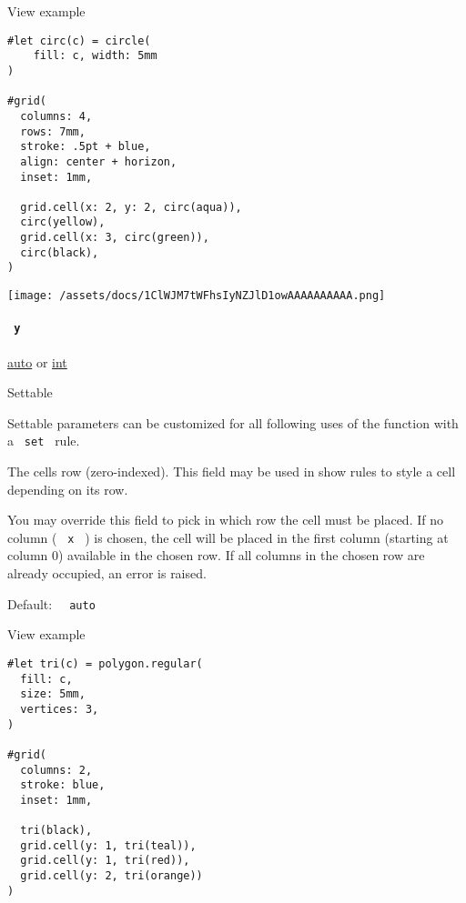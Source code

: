 
View example

\begin{verbatim}
#let circ(c) = circle(
    fill: c, width: 5mm
)

#grid(
  columns: 4,
  rows: 7mm,
  stroke: .5pt + blue,
  align: center + horizon,
  inset: 1mm,

  grid.cell(x: 2, y: 2, circ(aqua)),
  circ(yellow),
  grid.cell(x: 3, circ(green)),
  circ(black),
)
\end{verbatim}

\texttt{[image: /assets/docs/1ClWJM7tWFhsIyNZJlD1owAAAAAAAAAA.png]}

\paragraph{\texorpdfstring{\texttt{\ y\ }}{ y }}\label{definitions-cell-y}

\href{/docs/reference/foundations/auto/}{auto} {or}
\href{/docs/reference/foundations/int/}{int}

{{ Settable }}

\label{definitions-cell-y-settable-tooltip}
Settable parameters can be customized for all following uses of the
function with a \texttt{\ set\ } rule.

The cell\textquotesingle s row (zero-indexed). This field may be used in
show rules to style a cell depending on its row.

You may override this field to pick in which row the cell must be
placed. If no column ( \texttt{\ x\ } ) is chosen, the cell will be
placed in the first column (starting at column 0) available in the
chosen row. If all columns in the chosen row are already occupied, an
error is raised.

Default: \texttt{\ }{\texttt{\ auto\ }}\texttt{\ }


View example

\begin{verbatim}
#let tri(c) = polygon.regular(
  fill: c,
  size: 5mm,
  vertices: 3,
)

#grid(
  columns: 2,
  stroke: blue,
  inset: 1mm,

  tri(black),
  grid.cell(y: 1, tri(teal)),
  grid.cell(y: 1, tri(red)),
  grid.cell(y: 2, tri(orange))
)
\end{verbatim}


